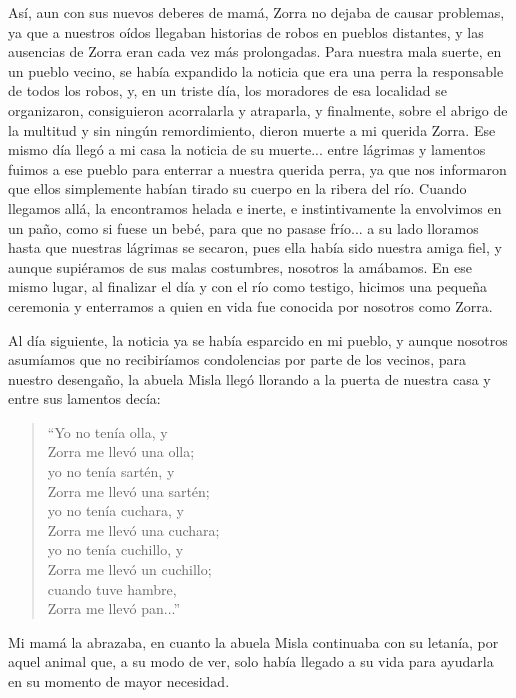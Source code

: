 Así, aun con sus nuevos deberes de mamá, Zorra no dejaba de causar problemas, ya que a nuestros oídos llegaban historias de robos en pueblos distantes, y las ausencias de Zorra eran cada vez más prolongadas.
Para nuestra mala suerte, en un pueblo vecino, se había expandido la noticia que era una perra la responsable de todos los robos, y, en un triste día, los moradores de esa localidad se organizaron, consiguieron acorralarla y atraparla, y finalmente, sobre el abrigo de la multitud y sin ningún remordimiento, dieron muerte a mi querida Zorra. 
Ese mismo día llegó a mi casa la noticia de su muerte... entre lágrimas y lamentos fuimos a ese pueblo para enterrar a nuestra querida perra, ya que nos informaron que ellos simplemente habían tirado su cuerpo en la ribera del río. Cuando llegamos allá, la encontramos helada e inerte, e instintivamente la envolvimos en un paño, como si fuese un bebé, para que no pasase frío... a su lado lloramos hasta que nuestras lágrimas se secaron, pues ella había sido nuestra amiga fiel, y aunque supiéramos de sus malas costumbres, nosotros la amábamos.
En ese mismo lugar, al finalizar el día y con el río como testigo, hicimos una pequeña ceremonia y enterramos a quien en vida fue conocida por nosotros como Zorra.

Al día siguiente, la noticia ya se había esparcido en mi pueblo, y aunque nosotros asumíamos que no recibiríamos condolencias por parte de los vecinos, para nuestro desengaño, la abuela Misla llegó llorando a la puerta de nuestra casa y entre sus lamentos decía:
\begin{quotation}
\noindent ``Yo no tenía olla, y \\Zorra me llevó una olla;\\ 
yo no tenía sartén, y \\Zorra me llevó una sartén;\\ 
yo no tenía cuchara, y \\Zorra me llevó una cuchara;\\
yo no tenía cuchillo, y \\Zorra me llevó un cuchillo;\\
cuando tuve hambre, \\Zorra me llevó pan...''
\end{quotation}
Mi mamá la abrazaba, en cuanto la abuela Misla continuaba con su letanía, por aquel animal que, a su modo de ver, solo había llegado a su vida para ayudarla en su momento de mayor necesidad.


